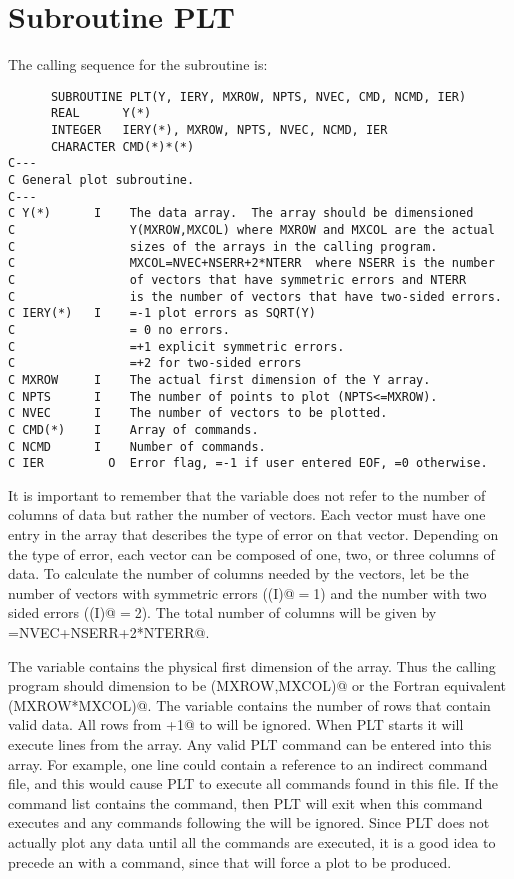 \section{Subroutine PLT}
The calling sequence for the \verb@PLT@ subroutine is:
\medskip
\begin{verbatim}
      SUBROUTINE PLT(Y, IERY, MXROW, NPTS, NVEC, CMD, NCMD, IER)
      REAL      Y(*)
      INTEGER   IERY(*), MXROW, NPTS, NVEC, NCMD, IER
      CHARACTER CMD(*)*(*)
C---
C General plot subroutine.
C---
C Y(*)      I    The data array.  The array should be dimensioned
C                Y(MXROW,MXCOL) where MXROW and MXCOL are the actual
C                sizes of the arrays in the calling program.
C                MXCOL=NVEC+NSERR+2*NTERR  where NSERR is the number
C                of vectors that have symmetric errors and NTERR
C                is the number of vectors that have two-sided errors.
C IERY(*)   I    =-1 plot errors as SQRT(Y)
C                = 0 no errors.
C                =+1 explicit symmetric errors.
C                =+2 for two-sided errors
C MXROW     I    The actual first dimension of the Y array.
C NPTS      I    The number of points to plot (NPTS<=MXROW).
C NVEC      I    The number of vectors to be plotted.
C CMD(*)    I    Array of commands.
C NCMD      I    Number of commands.
C IER         O  Error flag, =-1 if user entered EOF, =0 otherwise.
\end{verbatim}
\medskip
It is important to remember that the variable \verb@NVEC@ does not
refer to the number of columns of data but rather the number of vectors.
Each vector must have one entry in the \verb@IERY@ array that
describes the type of error on that vector.
Depending on the type of error, each vector can be composed of one,
two, or three columns of data.
To calculate the number of columns needed by the vectors,
let \verb@NSERR@ be the number of vectors with symmetric errors
(\verb@IERY(I)@$=$1) and \verb@NTERR@ the number with two sided errors
(\verb@IERY(I)@$=$2).
The total number of columns \verb@MXCOL@ will be given by
\verb@MXCOL=NVEC+NSERR+2*NTERR@.

The variable \verb@MXROW@ contains the physical first dimension of
the \verb@Y@ array.
Thus the calling program should dimension \verb@Y@ to be
\verb@(MXROW,MXCOL)@ or the Fortran equivalent \verb@(MXROW*MXCOL)@.
The variable \verb@NPTS@ contains the number of rows that contain
valid data.
All rows from \verb@NPTS+1@ to \verb@MXROW@ will be ignored.
When PLT starts it will execute \verb@NCMD@ lines from the \verb@CMD@
array.
Any valid PLT command can be entered into this array.
For example, one line could contain a reference to an indirect command
file, and this would cause PLT to execute all commands found in this
file.
If the command list contains the \verb@EXit@ command, then PLT will
exit when this command executes and any commands following the \verb@EXit@
will be ignored.
Since PLT does not actually plot any data until all the commands are
executed, it is a good idea to precede an \verb@EXit@ with a \verb@Plot@
command, since that will force a plot to be produced.


